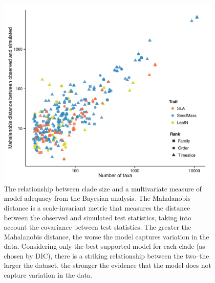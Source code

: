 \documentclass[12pt,twoside]{article}
\begin{document}
\begin{figure}[p]
  \centering
  \includegraphics[width=\textwidth]{figs/ad-size-bayes}
  \caption[Model adequacy vs. clade size (Bayesian)]{The relationship between clade size and a multivariate measure of model adequacy from the Bayesian analysis. The Mahalanobis distance is a scale-invariant metric that measures the distance between the observed and simulated test statistics, taking into account the covariance between test statistics. The greater the Mahalanobis distance, the worse the model captures variation in the data. Considering only the best supported model for each clade (as chosen by DIC), there is a striking relationship between the two--the larger the dataset, the stronger the evidence that the model does not capture variation in the data.}
  \label{fig:supp-size-adequacy}
\end{figure}

\end{document}
